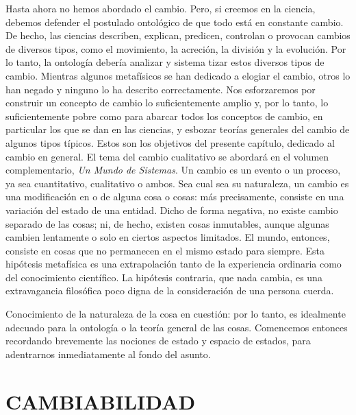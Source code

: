 \begin{justifying}
  \noindent 
  Hasta ahora no hemos abordado el cambio. Pero, si creemos en la ciencia, debemos defender el postulado ontológico de que todo 
  está en constante cambio. De hecho, las ciencias describen, explican, predicen, 
  controlan o provocan cambios de diversos tipos, como el movimiento, la acreción, 
  la división y la evolución. Por lo tanto, la ontología debería analizar y sistema tizar estos diversos tipos de cambio.
  Mientras algunos metafísicos se han dedicado a elogiar el cambio, otros lo han negado y ninguno lo ha descrito correctamente. Nos esforzaremos por construir un concepto de cambio lo suficientemente amplio y, por lo tanto, lo suficientemente pobre como para abarcar todos los conceptos de cambio, en particular los que se dan en las ciencias, y esbozar teorías generales del cambio de algunos tipos típicos. Estos son los objetivos del presente capítulo, dedicado al cambio en general. El tema del cambio cualitativo se abordará en el volumen complementario, \textit{Un Mundo de Sistemas}.
  Un cambio es un evento o un proceso, ya sea cuantitativo, cualitativo o ambos. Sea cual sea su naturaleza, un cambio es una modificación en o de alguna cosa o cosas: más precisamente, consiste en una variación del estado de una entidad. Dicho de forma negativa, no existe cambio separado de las cosas; ni, de hecho, existen cosas inmutables, aunque algunas cambien lentamente o solo en ciertos aspectos limitados. El mundo, entonces, consiste en cosas que no permanecen en el mismo estado para siempre. Esta hipótesis metafísica es una extrapolación tanto de la experiencia ordinaria como del conocimiento científico. La hipótesis contraria, que nada cambia, es una extravagancia filosófica poco digna de la consideración de una persona cuerda.

  \newpage

	\noindent Conocimiento de la naturaleza de la cosa en cuestión: por lo tanto,
	es idealmente adecuado para la ontología o la teoría general de las cosas.
	Comencemos entonces recordando brevemente las nociones de estado y espacio de estados,
	para adentrarnos inmediatamente al fondo del asunto.

	\section{\centering \large CAMBIABILIDAD}

\end{justifying}
